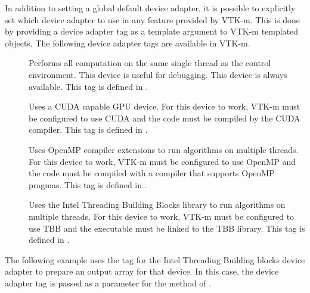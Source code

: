 In addition to setting a global default device adapter, it is possible to
explicitly set which device adapter to use in any feature provided by
VTK-m. This is done by providing a device adapter tag as a template
argument to VTK-m templated objects. The following device adapter tags are
available in VTK-m.


\begin{description}
\item[]  Performs all
  computation on the same single thread as the control environment. This
  device is useful for debugging. This device is always available. This tag
  is defined in .
\item[]  Uses a CUDA capable
  GPU device. For this device to work, VTK-m must be configured to use CUDA
  and the code must be compiled by the CUDA 
  compiler. This tag is defined in
  .
\item[]  Uses OpenMP
  compiler extensions to run algorithms on multiple threads. For this
  device to work, VTK-m must be configured to use OpenMP and the code must be
  compiled with a compiler that supports OpenMP pragmas. This tag is
  defined in . 
\item[]
    Uses the Intel
  Threading Building Blocks library to run algorithms on multiple
  threads. For this device to work, VTK-m must be configured to use TBB and
  the executable must be linked to the TBB library. This tag is defined in
  .
\end{description}


The following example uses the tag for the Intel Threading Building blocks
device adapter to prepare an output array for that device. In this case,
the device adapter tag is passed as a parameter for the
  method of
.


